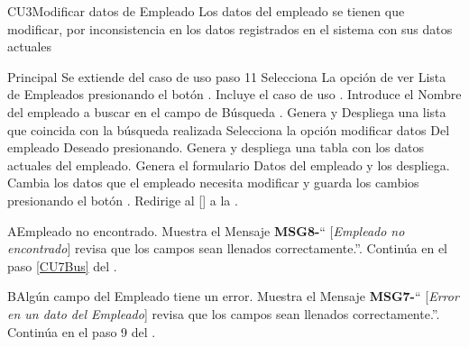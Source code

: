 \begin{UseCase}{CU3}{Modificar datos de  Empleado}{
		Los datos del empleado se tienen que modificar, por inconsistencia en los datos registrados en el sistema con sus datos actuales
	}
	\end{UseCase}
	\begin{UCtrayectoria}{Principal}
		\UCpaso Se extiende del caso de uso  paso 11
		\UCpaso[\UCactor] Selecciona La opción de ver Lista de  Empleados presionando el botón .
		\UCpaso Incluye el caso de uso .
		\UCpaso[\UCactor] Introduce el Nombre del empleado a buscar en el campo de Búsqueda  .
		\UCpaso Genera y Despliega una lista que coincida con la búsqueda realizada
		\UCpaso[\UCactor] Selecciona la opción modificar datos Del empleado Deseado presionando.
		\UCpaso Genera y despliega una tabla con los datos actuales del empleado.
		\UCpaso Genera el formulario Datos del empleado y los despliega.
		\UCpaso[\UCactor] Cambia los datos que el empleado necesita modificar y guarda los cambios presionando el botón  .
		\UCpaso Redirige al [\UCactor] a la  .
	\end{UCtrayectoria}




\begin{UCtrayectoriaA}{A}{Empleado no encontrado.}
			\UCpaso Muestra el Mensaje {\bf MSG8-}`` [{\em Empleado no encontrado}] revisa que los campos sean llenados correctamente.''.
			\UCpaso Continúa en el paso \ref{CU7Bus} del .
		\end{UCtrayectoriaA}


\begin{UCtrayectoriaA}{B}{Algún campo del Empleado tiene un error.}
			\UCpaso Muestra el Mensaje {\bf MSG7-}`` [{\em Error en un dato del Empleado}] revisa que los campos sean llenados correctamente.''.
			\UCpaso Continúa en el paso 9 del .
		\end{UCtrayectoriaA}

